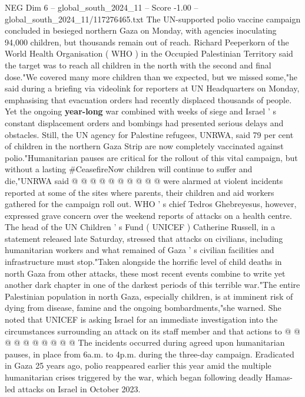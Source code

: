 \begin{textsample}{NEG Dim 6 – global\_south\_2024\_11 – Score -1.00 – global\_south\_2024\_11/117276465.txt}  \label{ex:f6_neg_069}
The UN-supported polio vaccine campaign concluded in besieged northern Gaza on Monday, with agencies inoculating 94,000 children, but thousands remain out of reach.
Richard Peeperkorn of the World Health Organisation ( WHO ) in the Occupied Palestinian Territory said the target was to reach all children in the north with the second and final dose."We covered many more children than we expected, but we missed some,"he said during a briefing via videolink for reporters at UN Headquarters on Monday, emphasising that evacuation orders had recently displaced thousands of people.
Yet the ongoing \textbf{year-long} war combined with weeks of siege and Israel ' s constant displacement orders and bombings had presented serious delays and obstacles.
Still, the UN agency for Palestine refugees, UNRWA, said 79 per cent of children in the northern Gaza Strip are now completely vaccinated against polio."Humanitarian pauses are critical for the rollout of this vital campaign, but without a lasting \#CeasefireNow children will continue to suffer and die,"UNRWA said @ @ @ @ @ @ @ @ @ @ were alarmed at violent incidents reported at some of the sites where parents, their children and aid workers gathered for the campaign roll out.
WHO ' s chief Tedros Ghebreyesus, however, expressed grave concern over the weekend reports of attacks on a health centre.
The head of the UN Children ' s Fund ( UNICEF ) Catherine Russell, in a statement released late Saturday, stressed that attacks on civilians, including humanitarian workers and what remained of Gaza ' s civilian facilities and infrastructure must stop."Taken alongside the horrific level of child deaths in north Gaza from other attacks, these most recent events combine to write yet another dark chapter in one of the darkest periods of this terrible war."The entire Palestinian population in north Gaza, especially children, is at imminent risk of dying from disease, famine and the ongoing bombardments,"she warned.
She noted that UNICEF is asking Israel for an immediate investigation into the circumstances surrounding an attack on its staff member and that actions to @ @ @ @ @ @ @ @ @ @ The incidents occurred during agreed upon humanitarian pauses, in place from 6a.m. to 4p.m. during the three-day campaign.
Eradicated in Gaza 25 years ago, polio reappeared earlier this year amid the multiple humanitarian crises triggered by the war, which began following deadly Hamas-led attacks on Israel in October 2023.

\end{textsample}
